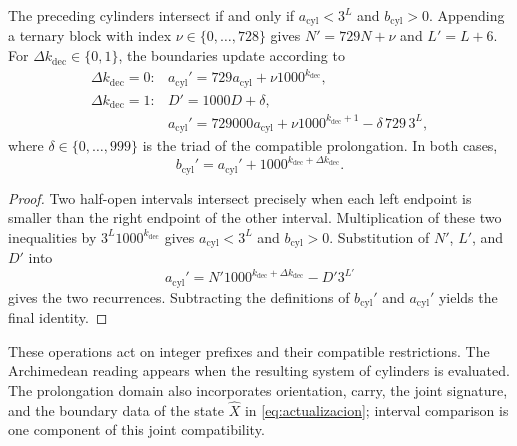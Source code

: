 \begin{lemma}
\label{memprof:cilindros}
The preceding cylinders intersect if and only if
\(a_{\mathrm{cyl}}<3^L\) and \(b_{\mathrm{cyl}}>0\).
Appending a ternary block with index
\(\nu\in\{0,\ldots,728\}\) gives \(N'=729N+\nu\) and
\(L'=L+6\). For \(\Delta k_{\mathrm{dec}}\in\{0,1\}\),
the boundaries update according to
\[
 \begin{array}{ll}
 \Delta k_{\mathrm{dec}}=0:
   &a_{\mathrm{cyl}}'=729a_{\mathrm{cyl}}+\nu1000^{k_{\mathrm{dec}}},\\[2pt]
 \Delta k_{\mathrm{dec}}=1:
   &D'=1000D+\delta,\\
   &a_{\mathrm{cyl}}'=729000a_{\mathrm{cyl}}
      +\nu1000^{k_{\mathrm{dec}}+1}-\delta\,729\,3^L ,
 \end{array}
\]
where \(\delta\in\{0,\ldots,999\}\) is the triad of the compatible
prolongation. In both cases,
\[
 b_{\mathrm{cyl}}'=a_{\mathrm{cyl}}'
          +1000^{k_{\mathrm{dec}}+\Delta k_{\mathrm{dec}}}.
\]
\end{lemma}
\begin{proof}
Two half-open intervals intersect precisely when each left endpoint is
smaller than the right endpoint of the other interval. Multiplication
of these two inequalities by \(3^L1000^{k_{\mathrm{dec}}}\) gives
\(a_{\mathrm{cyl}}<3^L\) and \(b_{\mathrm{cyl}}>0\).
Substitution of \(N'\), \(L'\), and \(D'\) into
\[
 a_{\mathrm{cyl}}'
 =N'1000^{k_{\mathrm{dec}}+\Delta k_{\mathrm{dec}}}-D'3^{L'}
\]
gives the two recurrences. Subtracting the definitions of
\(b_{\mathrm{cyl}}'\) and \(a_{\mathrm{cyl}}'\) yields the final identity.
\end{proof}

These operations act on integer prefixes and their compatible
restrictions. The Archimedean reading appears when the resulting system
of cylinders is evaluated. The prolongation domain also incorporates
orientation, carry, the joint signature, and the boundary data of the state
\(\widehat X\) in \eqref{eq:actualizacion}; interval comparison is one
component of this joint compatibility.
